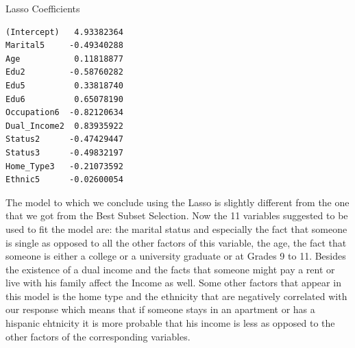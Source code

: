 \documentclass[11pt]{article}
\begin{document}
Lasso Coefficients
\begin{verbatim}
(Intercept)   4.93382364      
Marital5     -0.49340288
Age           0.11818877
Edu2         -0.58760282      
Edu5          0.33818740
Edu6          0.65078190       
Occupation6  -0.82120634    
Dual_Income2  0.83935922     
Status2      -0.47429447
Status3      -0.49832197       
Home_Type3   -0.21073592      
Ethnic5      -0.02600054
 \end{verbatim} 
 
 The model to which we conclude using the Lasso is slightly different from the one that we got from the Best Subset Selection. Now the 11 variables suggested to be used to fit the model are: the marital status and especially the fact that someone is single as opposed to all the other factors of this variable, the age, the fact that someone is either a college or a university graduate or at Grades 9 to 11. Besides the existence of a dual income and the facts that someone might pay a rent or live with his family affect the Income as well. Some other factors that appear in this model is the home type and the ethnicity that are negatively correlated with our response which means that if someone stays in an apartment or has a hispanic ehtnicity it is more probable that his income is less as opposed to the other factors of the corresponding variables.
\end{document}
